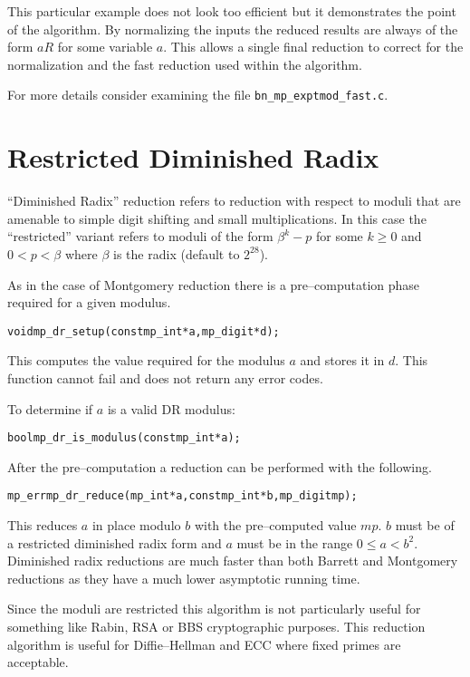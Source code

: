\documentclass[synpaper]{book}
\begin{document}
This particular example does not look too efficient but it demonstrates the point of the algorithm.
By normalizing the inputs the reduced results are always of the form $aR$ for some variable $a$.
This allows a single final reduction to correct for the normalization and the fast reduction used
within the algorithm.

For more details consider examining the file \texttt{bn\_mp\_exptmod\_fast.c}.

\section{Restricted Diminished Radix}

``Diminished Radix'' reduction refers to reduction with respect to moduli that are amenable to
simple digit shifting and small multiplications.  In this case the ``restricted'' variant refers to
moduli of the form $\beta^k - p$ for some $k \ge 0$ and $0 < p < \beta$ where $\beta$ is the radix
(default to $2^{28}$).

As in the case of Montgomery reduction there is a pre--computation phase required for a given
modulus.

\begin{alltt}
void mp_dr_setup(const mp_int *a, mp_digit *d);
\end{alltt}

This computes the value required for the modulus $a$ and stores it in $d$.  This function cannot
fail and does not return any error codes.

To determine if $a$ is a valid DR modulus:
\begin{alltt}
bool mp_dr_is_modulus(const mp_int *a);
\end{alltt}

After the pre--computation a reduction can be performed with the following.

\begin{alltt}
mp_err mp_dr_reduce(mp_int *a, const mp_int *b, mp_digit mp);
\end{alltt}

This reduces $a$ in place modulo $b$ with the pre--computed value $mp$. $b$ must be of a restricted
diminished radix form and $a$ must be in the range $0 \le a < b^2$.  Diminished radix reductions
are much faster than both Barrett and Montgomery reductions as they have a much lower asymptotic
running time.

Since the moduli are restricted this algorithm is not particularly useful for something like Rabin,
RSA or BBS cryptographic purposes.  This reduction algorithm is useful for Diffie--Hellman and ECC
where fixed primes are acceptable.
\end{document}
